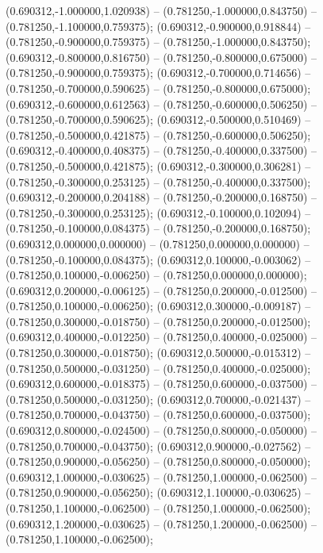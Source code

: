  (0.690312,-1.000000,1.020938) -- (0.781250,-1.000000,0.843750) -- (0.781250,-1.100000,0.759375);
 (0.690312,-0.900000,0.918844) -- (0.781250,-0.900000,0.759375) -- (0.781250,-1.000000,0.843750);
 (0.690312,-0.800000,0.816750) -- (0.781250,-0.800000,0.675000) -- (0.781250,-0.900000,0.759375);
 (0.690312,-0.700000,0.714656) -- (0.781250,-0.700000,0.590625) -- (0.781250,-0.800000,0.675000);
 (0.690312,-0.600000,0.612563) -- (0.781250,-0.600000,0.506250) -- (0.781250,-0.700000,0.590625);
 (0.690312,-0.500000,0.510469) -- (0.781250,-0.500000,0.421875) -- (0.781250,-0.600000,0.506250);
 (0.690312,-0.400000,0.408375) -- (0.781250,-0.400000,0.337500) -- (0.781250,-0.500000,0.421875);
 (0.690312,-0.300000,0.306281) -- (0.781250,-0.300000,0.253125) -- (0.781250,-0.400000,0.337500);
 (0.690312,-0.200000,0.204188) -- (0.781250,-0.200000,0.168750) -- (0.781250,-0.300000,0.253125);
 (0.690312,-0.100000,0.102094) -- (0.781250,-0.100000,0.084375) -- (0.781250,-0.200000,0.168750);
 (0.690312,0.000000,0.000000) -- (0.781250,0.000000,0.000000) -- (0.781250,-0.100000,0.084375);
 (0.690312,0.100000,-0.003062) -- (0.781250,0.100000,-0.006250) -- (0.781250,0.000000,0.000000);
 (0.690312,0.200000,-0.006125) -- (0.781250,0.200000,-0.012500) -- (0.781250,0.100000,-0.006250);
 (0.690312,0.300000,-0.009187) -- (0.781250,0.300000,-0.018750) -- (0.781250,0.200000,-0.012500);
 (0.690312,0.400000,-0.012250) -- (0.781250,0.400000,-0.025000) -- (0.781250,0.300000,-0.018750);
 (0.690312,0.500000,-0.015312) -- (0.781250,0.500000,-0.031250) -- (0.781250,0.400000,-0.025000);
 (0.690312,0.600000,-0.018375) -- (0.781250,0.600000,-0.037500) -- (0.781250,0.500000,-0.031250);
 (0.690312,0.700000,-0.021437) -- (0.781250,0.700000,-0.043750) -- (0.781250,0.600000,-0.037500);
 (0.690312,0.800000,-0.024500) -- (0.781250,0.800000,-0.050000) -- (0.781250,0.700000,-0.043750);
 (0.690312,0.900000,-0.027562) -- (0.781250,0.900000,-0.056250) -- (0.781250,0.800000,-0.050000);
 (0.690312,1.000000,-0.030625) -- (0.781250,1.000000,-0.062500) -- (0.781250,0.900000,-0.056250);
 (0.690312,1.100000,-0.030625) -- (0.781250,1.100000,-0.062500) -- (0.781250,1.000000,-0.062500);
 (0.690312,1.200000,-0.030625) -- (0.781250,1.200000,-0.062500) -- (0.781250,1.100000,-0.062500);
